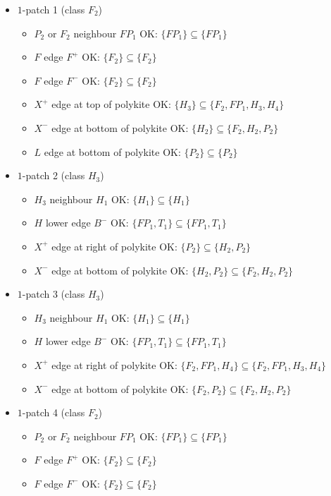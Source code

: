 \begin{itemize}
\item $1$-patch 1 (class $F_2$)
\begin{itemize}
\item $P_2$ or $F_2$ neighbour $FP_1$ OK: $\{FP_1\} \subseteq \{FP_1\}$
\item $F$ edge $F^+$ OK: $\{F_2\} \subseteq \{F_2\}$
\item $F$ edge $F^-$ OK: $\{F_2\} \subseteq \{F_2\}$
\item $X^+$ edge at top of polykite OK: $\{H_3\} \subseteq \{F_2, FP_1, H_3, H_4\}$
\item $X^-$ edge at bottom of polykite OK: $\{H_2\} \subseteq \{F_2, H_2, P_2\}$
\item $L$ edge at bottom of polykite OK: $\{P_2\} \subseteq \{P_2\}$
\end{itemize}
\item $1$-patch 2 (class $H_3$)
\begin{itemize}
\item $H_3$ neighbour $H_1$ OK: $\{H_1\} \subseteq \{H_1\}$
\item $H$ lower edge $B^-$ OK: $\{FP_1, T_1\} \subseteq \{FP_1, T_1\}$
\item $X^+$ edge at right of polykite OK: $\{P_2\} \subseteq \{H_2, P_2\}$
\item $X^-$ edge at bottom of polykite OK: $\{H_2, P_2\} \subseteq \{F_2, H_2, P_2\}$
\end{itemize}
\item $1$-patch 3 (class $H_3$)
\begin{itemize}
\item $H_3$ neighbour $H_1$ OK: $\{H_1\} \subseteq \{H_1\}$
\item $H$ lower edge $B^-$ OK: $\{FP_1, T_1\} \subseteq \{FP_1, T_1\}$
\item $X^+$ edge at right of polykite OK: $\{F_2, FP_1, H_4\} \subseteq \{F_2, FP_1, H_3, H_4\}$
\item $X^-$ edge at bottom of polykite OK: $\{F_2, P_2\} \subseteq \{F_2, H_2, P_2\}$
\end{itemize}
\item $1$-patch 4 (class $F_2$)
\begin{itemize}
\item $P_2$ or $F_2$ neighbour $FP_1$ OK: $\{FP_1\} \subseteq \{FP_1\}$
\item $F$ edge $F^+$ OK: $\{F_2\} \subseteq \{F_2\}$
\item $F$ edge $F^-$ OK: $\{F_2\} \subseteq \{F_2\}$

\end{itemize}
\end{itemize}
